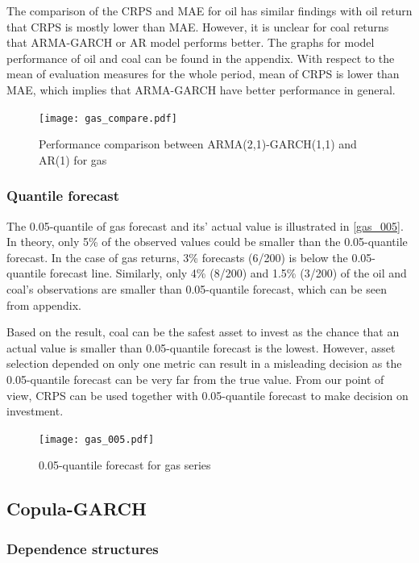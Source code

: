 \documentclass[12pt,a4paper]{article}
\newcommand\colorAutoref[1]{{\hypersetup{linkcolor=black}\autoref{#1}}}
\numberwithin{equation}{section}
\begin{document}
The comparison of the CRPS and MAE for oil has similar findings with oil return that CRPS is mostly lower than MAE. However, it is unclear for coal returns that ARMA-GARCH or AR model performs better. The graphs for model performance of oil and coal can be found in the appendix. With respect to the mean of evaluation measures for the whole period, mean of CRPS is lower than MAE, which implies that ARMA-GARCH have better performance in general.

\vspace{-5mm}
\begin{figure}[h!] 
\texttt{[image: gas\_compare.pdf]}
\vspace*{-23mm}
\caption{Performance comparison between ARMA(2,1)-GARCH(1,1) and AR(1) for gas}
\label{gas_compare}
\end{figure}

\subsubsection{Quantile forecast}
The 0.05-quantile of gas forecast and its' actual value is illustrated in \colorAutoref{gas_005}. In theory, only 5\% of the observed values could be smaller than the 0.05-quantile forecast. In the case of gas returns, 3\% forecasts (6/200) is below the 0.05-quantile forecast line. Similarly, only 4\% (8/200) and 1.5\% (3/200) of the oil and coal's observations are smaller than 0.05-quantile forecast, which can be seen from appendix.

Based on the result, coal can be the safest asset to invest as the chance that an actual value is smaller than 0.05-quantile forecast is the lowest. However, asset selection depended on only one metric can result in a misleading decision as the 0.05-quantile forecast can be very far from the true value. From our point of view, CRPS can be used together with 0.05-quantile forecast to make decision on investment.

\begin{figure}[h!] 
\texttt{[image: gas\_005.pdf]}
\vspace*{-23mm}
\caption{0.05-quantile forecast for gas series}
\label{gas_005}
\end{figure}

\subsection{Copula-GARCH}

\subsubsection{Dependence structures}
\end{document}
